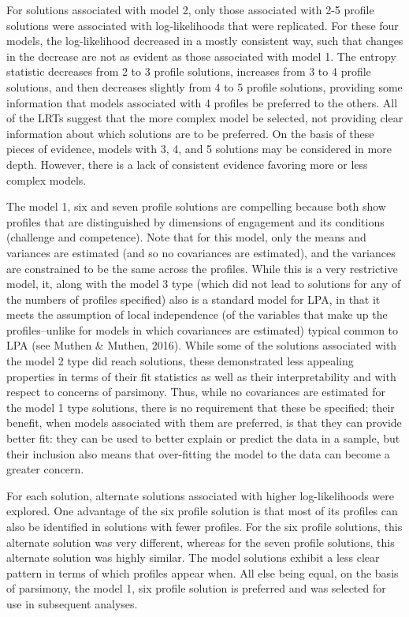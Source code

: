\documentclass[]{book}
\theoremstyle{definition}
\theoremstyle{definition}
\theoremstyle{definition}
\theoremstyle{remark}
\begin{document}
For solutions associated with model 2, only those associated with 2-5
profile solutions were associated with log-likelihoods that were
replicated. For these four models, the log-likelihood decreased in a
mostly consistent way, such that changes in the decrease are not as
evident as those associated with model 1. The entropy statistic
decreases from 2 to 3 profile solutions, increases from 3 to 4 profile
solutions, and then decreases slightly from 4 to 5 profile solutions,
providing some information that models associated with 4 profiles be
preferred to the others. All of the LRTs suggest that the more complex
model be selected, not providing clear information about which solutions
are to be preferred. On the basis of these pieces of evidence, models
with 3, 4, and 5 solutions may be considered in more depth. However,
there is a lack of consistent evidence favoring more or less complex
models.

The model 1, six and seven profile solutions are compelling because both
show profiles that are distinguished by dimensions of engagement and its
conditions (challenge and competence). Note that for this model, only
the means and variances are estimated (and so no covariances are
estimated), and the variances are constrained to be the same across the
profiles. While this is a very restrictive model, it, along with the
model 3 type (which did not lead to solutions for any of the numbers of
profiles specified) also is a standard model for LPA, in that it meets
the assumption of local independence (of the variables that make up the
profiles--unlike for models in which covariances are estimated) typical
common to LPA (see Muthen \& Muthen, 2016). While some of the solutions
associated with the model 2 type did reach solutions, these demonstrated
less appealing properties in terms of their fit statistics as well as
their interpretability and with respect to concerns of parsimony. Thus,
while no covariances are estimated for the model 1 type solutions, there
is no requirement that these be specified; their benefit, when models
associated with them are preferred, is that they can provide better fit:
they can be used to better explain or predict the data in a sample, but
their inclusion also means that over-fitting the model to the data can
become a greater concern.

For each solution, alternate solutions associated with higher
log-likelihoods were explored. One advantage of the six profile solution
is that most of its profiles can also be identified in solutions with
fewer profiles. For the six profile solutions, this alternate solution
was very different, whereas for the seven profile solutions, this
alternate solution was highly similar. The model solutions exhibit a
less clear pattern in terms of which profiles appear when. All else
being equal, on the basis of parsimony, the model 1, six profile
solution is preferred and was selected for use in subsequent analyses.
\end{document}
